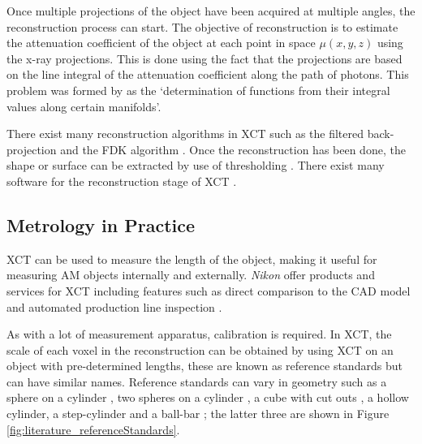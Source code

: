 Once multiple projections of the object have been acquired at multiple angles, the reconstruction process can start. The objective of reconstruction is to estimate the attenuation coefficient of the object at each point in space $\mu(x,y,z)$ using the x-ray projections. This is done using the fact that the projections are based on the line integral of the attenuation coefficient along the path of photons. This problem was formed by \cite{radon1986on} as the `determination of functions from their integral values along certain manifolds'.

There exist many reconstruction algorithms in XCT \citep{smith1990cone} such as the filtered back-projection \citep{brooks1976principles} and the FDK algorithm \citep{feldkamp1984practical}. Once the reconstruction has been done, the shape or surface can be extracted by use of thresholding \citep{kruth2011computed}. There exist many software for the reconstruction stage of XCT \citep{reinhart2008industrial, sun2012overview}.

\subsection{Metrology in Practice}

XCT can be used to measure the length of the object, making it useful for measuring AM objects internally and externally. \emph{Nikon} offer products and services for XCT including features such as direct comparison to the CAD model \citep{nikon2015microfocus, nikon2018mct225} and automated production line inspection \citep{nikon2015inline, nikon2018automated}.

As with a lot of measurement apparatus, calibration is required. In XCT, the scale of each voxel in the reconstruction can be obtained by using XCT on an object with pre-determined lengths, these are known as reference standards \citep{bartscher2007enhancement} but can have similar names. Reference standards can vary in geometry such as a sphere on a cylinder \citep{lifton2013application}, two spheres on a cylinder \citep{sun2016reference}, a cube with cut outs \citep{kiekens2011test}, a hollow cylinder, a step-cylinder and a ball-bar \citep{bartscher2007enhancement}; the latter three are shown in Figure \ref{fig:literature_referenceStandards}.

